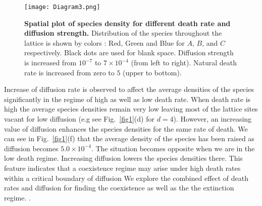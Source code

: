 \documentclass[aps, pre, twocolumn, amsmath, superscriptaddress,showkeys,showpacs]{revtex4-1}
\begin{document}
\begin{figure}
	\texttt{[image: Diagram3.png]}
	\caption{{\bf Spatial plot of species density for different death rate and diffusion strength.} Distribution of the species throughout the lattice is shown by colors : Red, Green and Blue for $A$, $B$, and $C$ respectively. Black dots are  used for blank space. Diffusion strength is increased from $10^{-7}$ to $7\times 10^{-4}$ (from left to right). Natural death rate is increased from zero to $5$ (upper to bottom). }
	\label{fig3-spiral}
\end{figure}
Increase of diffusion rate is observed to affect the average densities of the species significantly in the regime of high as well as low death rate. When death rate is high the average species densities remain very low leaving most of the lattice sites vacant for low diffusion (e.g see Fig.\ \ref{fig1}(d) for $d=4$). %
However, an increasing value of diffusion %
 { enhances} the species densities for the same rate of death. We can see in Fig.~\ref{fig1}(f) that the average density of the species has been raised as diffusion becomes $5.0\times10^{-4}$. The situation becomes opposite when we are in the low death regime. Increasing diffusion lowers the species densities there. %
  { This feature indicates that a coexistence regime may arise under high death rates within a critical boundary of diffusion } %
{ We explore the combined effect of death rates and diffusion for finding the coexistence as well as the the extinction regime. }.%
\end{document}
